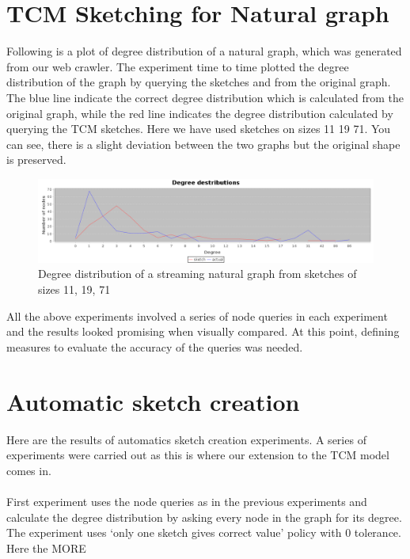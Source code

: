 \documentclass[12pt]{report}
\numberwithin{figure}{section}
\numberwithin{table}{section}
\begin{document}
\section{TCM Sketching for Natural graph}
Following is a plot of degree distribution of a natural graph, which was generated from our web crawler. The experiment time to time plotted the degree distribution of the graph by querying the sketches and from the original graph. The blue line indicate the correct degree distribution which is calculated from the original graph, while the red line indicates the degree distribution calculated by querying the TCM sketches. Here we have used sketches on sizes 11 19 71. You can see, there is a slight deviation between the two graphs but the original shape is preserved.

\begin{figure}[H]
\centering
\includegraphics[scale=0.3]{images/ddn}
\caption{Degree distribution of a streaming natural graph from sketches of sizes 11, 19, 71}
\end{figure}

All the above experiments involved a series of node queries in each experiment and the results looked promising when visually compared. At this point, defining measures to evaluate the accuracy of the queries was needed. 

\section{Automatic sketch creation}
Here are the results of automatics sketch creation experiments. A series of experiments were carried out as this is where our extension to the TCM model comes in. 

\paragraph{}

First experiment uses the node queries as in the previous experiments and calculate the degree distribution by asking every node in the graph for its degree. The experiment uses ‘only one sketch gives correct value’ policy with 0 tolerance. Here the MORE
\end{document}
